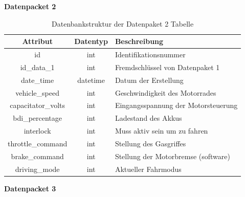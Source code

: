 \begin{center}
	\textbf{Datenpacket 2}
\end{center}

\begin{table}[H]
	\begin{center}
		\begin{tabular}{|c|c|l|}
			\hline
			\textbf{Attribut}  & \textbf{Datentyp} & \textbf{Beschreibung}               \\ \hline
			id                 & int               & Identifikationsnummer               \\ \hline
			id\_data\_1        & int               & Fremdschlüssel von Datenpaket 1     \\ \hline
			date\_time         & datetime          & Datum der Erstellung                \\ \hline
			vehicle\_speed     & int               & Geschwindigkeit des Motorrades      \\ \hline
			capacitator\_volts & int               & Eingangsspannung der Motorsteuerung \\ \hline
			bdi\_percentage    & int               & Ladestand des Akkus              	 \\ \hline
			interlock          & int               & Muss aktiv sein um zu fahren        \\ \hline
			throttle\_command  & int               & Stellung des Gasgriffes             \\ \hline
			brake\_command     & int               & Stellung der Motorbremse (software) \\ \hline
			driving\_mode      & int               & Aktueller Fahrmodus                 \\ \hline
		\end{tabular}
			\caption{Datenbankstruktur der Datenpaket 2 Tabelle}
			\label{tab:data2}
	\end{center}
\end{table}

\begin{center}
	\textbf{Datenpacket 3}
\end{center}

